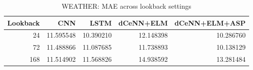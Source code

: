 \begin{table}
\caption{WEATHER: MAE across lookback settings}
\begin{tabular}{rrrrr}
\toprule
Lookback & CNN & LSTM & dCeNN+ELM & dCeNN+ELM+ASP \\
\midrule
24 & 11.595548 & 10.390210 & 12.148398 & 10.286760 \\
72 & 11.488866 & 11.087685 & 11.738893 & 10.138129 \\
168 & 11.514902 & 11.568826 & 14.938592 & 13.281484 \\
\bottomrule
\end{tabular}
\end{table}
